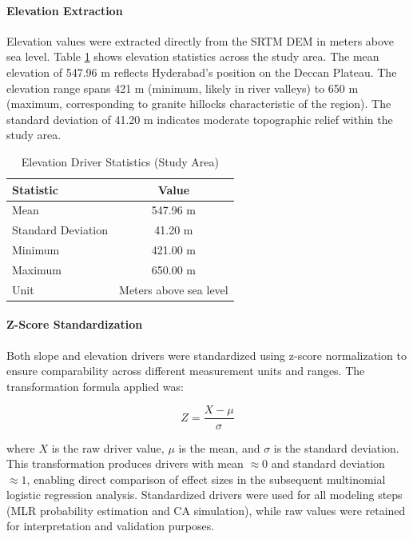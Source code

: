 \documentclass[conference]{IEEEtran}
\begin{document}
\paragraph{Elevation Extraction}
Elevation values were extracted directly from the SRTM DEM in meters above sea level. Table \ref{tab:elevation_stats} shows elevation statistics across the study area. The mean elevation of 547.96 m reflects Hyderabad's position on the Deccan Plateau. The elevation range spans 421 m (minimum, likely in river valleys) to 650 m (maximum, corresponding to granite hillocks characteristic of the region). The standard deviation of 41.20 m indicates moderate topographic relief within the study area.

\begin{table}[!t]
\caption{Elevation Driver Statistics (Study Area)}
\label{tab:elevation_stats}
\centering
\small
\begin{tabular}{lc}
\toprule
\textbf{Statistic} & \textbf{Value} \\
\midrule
Mean & 547.96 m \\
Standard Deviation & 41.20 m \\
Minimum & 421.00 m \\
Maximum & 650.00 m \\
Unit & Meters above sea level \\
\bottomrule
\end{tabular}
\end{table}

\paragraph{Z-Score Standardization}
Both slope and elevation drivers were standardized using z-score normalization to ensure comparability across different measurement units and ranges. The transformation formula applied was:

\begin{equation}
Z = \frac{X - \mu}{\sigma}
\label{eq:zscore}
\end{equation}

where $X$ is the raw driver value, $\mu$ is the mean, and $\sigma$ is the standard deviation. This transformation produces drivers with mean $\approx 0$ and standard deviation $\approx 1$, enabling direct comparison of effect sizes in the subsequent multinomial logistic regression analysis. Standardized drivers were used for all modeling steps (MLR probability estimation and CA simulation), while raw values were retained for interpretation and validation purposes.
\end{document}
